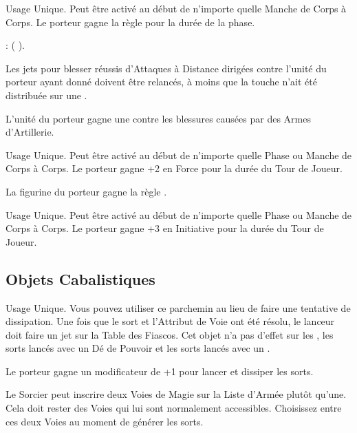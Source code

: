 Usage Unique. Peut être activé au début de n'importe quelle Manche de Corps à Corps. Le porteur gagne la règle \stubborn{} pour la durée de la phase.

 : \firesignature{} (\Pathof{} \fire{}).

\columnbreak

Les jets pour blesser réussis d'Attaques à Distance dirigées contre l'unité du porteur ayant donné  doivent être relancés, à moins que la touche n'ait été distribuée sur une \largetarget{}.

L'unité du porteur gagne une  contre les blessures causées par des Armes d'Artillerie.

Usage Unique. Peut être activé au début de n'importe quelle Phase ou Manche de Corps à Corps. Le porteur gagne +2 en Force pour la durée du Tour de Joueur.

La figurine du porteur gagne la règle \divineattacks{}.

Usage Unique. Peut être activé au début de n'importe quelle Phase ou Manche de Corps à Corps. Le porteur gagne +3 en Initiative pour la durée du Tour de Joueur.

\endpricelist

\newpage
\subsection{Objets Cabalistiques}

\startpricelist

Usage Unique. Vous pouvez utiliser ce parchemin au lieu de faire une tentative de dissipation. Une fois que le sort et l'Attribut de Voie ont été résolu, le lanceur doit faire un jet sur la Table des Fiascos. Cet objet n'a pas d'effet sur les \boundspells{}, les sorts lancés avec un Dé de Pouvoir et les sorts lancés avec un \overwhelmingpower{}.

Le porteur gagne un modificateur de +1 pour lancer et dissiper les sorts.

Le Sorcier peut inscrire deux Voies de Magie sur la Liste d'Armée plutôt qu'une. Cela doit rester des Voies qui lui sont normalement accessibles. Choisissez entre ces deux Voies au moment de générer les sorts.

